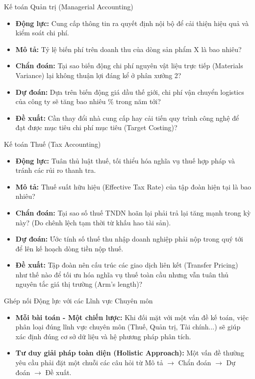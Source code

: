 \documentclass[aspectratio=169,12pt]{beamer}
\begin{document}
\begin{frame}{Kế toán Quản trị (Managerial Accounting)}
\begin{itemize}
    \item \textbf{Động lực:} Cung cấp thông tin ra quyết định nội bộ để cải thiện hiệu quả và kiểm soát chi phí.
    \item \textbf{Mô tả:} Tỷ lệ biến phí trên doanh thu của dòng sản phẩm X là bao nhiêu?
    \item \textbf{Chẩn đoán:} Tại sao biến động chi phí nguyên vật liệu trực tiếp (Materials Variance) lại không thuận lợi đáng kể ở phân xưởng 2?
    \item \textbf{Dự đoán:} Dựa trên biến động giá dầu thế giới, chi phí vận chuyển logistics của công ty sẽ tăng bao nhiêu \% trong năm tới?
    \item \textbf{Đề xuất:} Cần thay đổi nhà cung cấp hay cải tiến quy trình công nghệ để đạt được mục tiêu chi phí mục tiêu (Target Costing)?
\end{itemize}
\end{frame}

\begin{frame}{Kế toán Thuế (Tax Accounting)}
\begin{itemize}
    \item \textbf{Động lực:} Tuân thủ luật thuế, tối thiểu hóa nghĩa vụ thuế hợp pháp và tránh các rủi ro thanh tra.
    \item \textbf{Mô tả:} Thuế suất hữu hiệu (Effective Tax Rate) của tập đoàn hiện tại là bao nhiêu?
    \item \textbf{Chẩn đoán:} Tại sao số thuế TNDN hoãn lại phải trả lại tăng mạnh trong kỳ này? (Do chênh lệch tạm thời từ khấu hao tài sản).
    \item \textbf{Dự đoán:} Ước tính số thuế thu nhập doanh nghiệp phải nộp trong quý tới để lên kế hoạch dòng tiền nộp thuế.
    \item \textbf{Đề xuất:} Tập đoàn nên cấu trúc các giao dịch liên kết (Transfer Pricing) như thế nào để tối ưu hóa nghĩa vụ thuế toàn cầu nhưng vẫn tuân thủ nguyên tắc giá thị trường (Arm's length)?
\end{itemize}
\end{frame}

\begin{frame}{Ghép nối Động lực với các Lĩnh vực Chuyên môn}
\begin{itemize}
    \item \textbf{Mỗi bài toán - Một chiến lược:} Khi đối mặt với một vấn đề kế toán, việc phân loại đúng lĩnh vực chuyên môn (Thuế, Quản trị, Tài chính...) sẽ giúp xác định đúng cơ sở dữ liệu và hệ phương pháp phân tích.
    \item \textbf{Tư duy giải pháp toàn diện (Holistic Approach):} Một vấn đề thường yêu cầu phải đặt một chuỗi các câu hỏi từ Mô tả $\rightarrow$ Chẩn đoán $\rightarrow$ Dự đoán $\rightarrow$ Đề xuất.
\end{itemize}
\end{frame}
\end{document}
